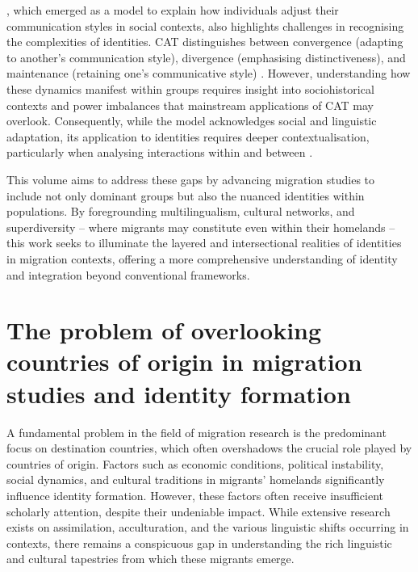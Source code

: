 \documentclass[output=paper,colorlinks,citecolor=brown]{langscibook}
\begin{document}
, which emerged as a model to explain how individuals adjust their communication styles in social contexts, also highlights challenges in recognising the complexities of  identities. CAT distinguishes between convergence (adapting to another's communication style), divergence (emphasising distinctiveness), and maintenance (retaining one's communicative style) \citep{Giles2016CommunicationAccommodation}. However, understanding how these dynamics manifest within  groups requires insight into sociohistorical contexts and power imbalances that mainstream applications of CAT may overlook. Consequently, while the model acknowledges social and linguistic adaptation, its application to  identities requires deeper contextualisation, particularly when analysing interactions within and between .

This volume aims to address these gaps by advancing migration studies to include not only dominant groups but also the nuanced identities within  populations. By foregrounding multilingualism, cultural networks, and superdiversity -- where migrants may constitute  even within their homelands -- this work seeks to illuminate the layered and intersectional realities of  identities in migration contexts, offering a more comprehensive understanding of identity and integration beyond conventional frameworks.

\section{The problem of overlooking countries of origin in migration studies and identity formation}\label{Intro.ss.3}

A fundamental problem in the field of migration research is the predominant focus on destination countries, which often overshadows the crucial role played by countries of origin. Factors such as economic conditions, political instability, social dynamics, and cultural traditions in migrants' homelands significantly influence identity formation. However, these factors often receive insufficient scholarly attention, despite their undeniable impact. While extensive research exists on assimilation, acculturation, and the various linguistic shifts occurring in  contexts, there remains a conspicuous gap in understanding the rich linguistic and cultural tapestries from which these migrants emerge.
\end{document}
